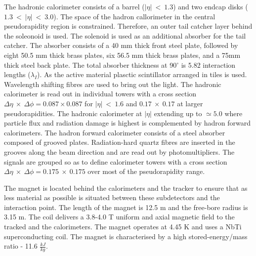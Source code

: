 The hadronic calorimeter \cite{HCAL_report} consists of a barrel ($\left|\eta\right|\ <\ 1.3$) and two endcap disks ($1.3\ <\ \left|\eta\right|\ <\ 3.0 $). The space of the hadron callorimeter in the central pseudorapidity region is constrained. Therefore, an outer tail catcher layer behind the soleonoid is used. The solenoid is used as an additional absorber for the tail catcher. The absorber consists of a 40 mm thick front steel plate, followed by eight 50.5 mm thick brass plates, six 56.5 mm thick brass plates, and a 75mm thick steel back plate. The total absorber thickness at 90$^{\circ}$ is 5.82 interaction lengths ($\lambda_{I}$). As the active material plasctic scintillator arranged in tiles is used. Wavelength shifting fibres are used to bring out the light. The hadronic calorimeter is read out in individual towers with a cross section $\Delta\eta\ \times\ \Delta\phi=0.087\times0.087$ for $\left|\eta\right|\ <\ 1.6$ and $0.17\ \times\ 0.17$ at larger pseudorapidities. The hadronic calorimeter at  $\left|\eta\right|$ extending up to $\simeq5.0$ where particle flux and radiation damage is highest is complemented by hadron forward calorimeters. The hadron forward calorimeter consists of a steel absorber composed of grooved plates. Radiation-hard quartz fibres are inserted in the grooves along the beam direction and are read out by photomultipliers. The signals are grouped so as to define calorimeter towers with a cross section $\Delta\eta\ \times\ \Delta\phi=0.175\ \times\ 0.175$ over most of the pseudorapidity range. 

The magnet is located behind the calorimeters and the tracker to ensure that as less material as possible is situated between these subdetectors and the interaction point. The length of the magnet is 12.5 m and the free-bore radius is 3.15 m. The coil delivers a 3.8-4.0 T uniform and axial magnetic field to the tracked and the calorimeters. The magnet operates at 4.45 K and uses a NbTi superconducting coil. The magnet is characterised by a high stored-energy/mass ratio - 11.6 $\frac{kJ}{kg}$.

